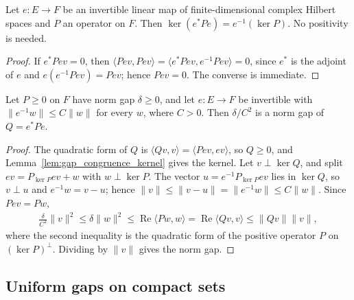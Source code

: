 \begin{lemma}
    \label{lem:gap_congruence_kernel}
    \leanok
    Let $e:E\to F$ be an invertible linear map of finite-dimensional complex Hilbert
    spaces and $P$ an operator on $F$. Then $\ker(e^*Pe)=e^{-1}(\ker P)$. No
    positivity is needed.
\end{lemma}
\begin{proof}\leanok
    If $e^*Pev=0$, then $\langle Pev,Pev\rangle=\langle e^*Pev,e^{-1}Pev\rangle=0$,
    since $e^*$ is the adjoint of $e$ and $e(e^{-1}Pev)=Pev$; hence $Pev=0$. The
    converse is immediate.
\end{proof}

\begin{theorem}
    \label{thm:gap_bounded_congruence}
    \leanok
    Let $P\ge0$ on $F$ have norm gap $\delta\ge0$, and let $e:E\to F$ be invertible with
    $\lVert e^{-1}w\rVert\le C\lVert w\rVert$ for every $w$, where $C>0$. Then
    $\delta/C^2$ is a norm gap of $Q=e^*Pe$.
\end{theorem}
\begin{proof}\leanok
    The quadratic form of $Q$ is $\langle Qv,v\rangle=\langle Pev,ev\rangle$, so
    $Q\ge0$, and Lemma~\ref{lem:gap_congruence_kernel} gives the kernel. Let
    $v\perp\ker Q$, and split $ev=P_{\ker P}ev+w$ with $w\perp\ker P$. The vector
    $u=e^{-1}P_{\ker P}ev$ lies in $\ker Q$, so $v\perp u$ and $e^{-1}w=v-u$; hence
    $\lVert v\rVert\le\lVert v-u\rVert=\lVert e^{-1}w\rVert\le C\lVert w\rVert$.
    Since $Pev=Pw$,
    \begin{align*}
        \tfrac{\delta}{C^2}\lVert v\rVert^2\le\delta\lVert w\rVert^2
        \le\operatorname{Re}\langle Pw,w\rangle=\operatorname{Re}\langle Qv,v\rangle
        \le\lVert Qv\rVert\lVert v\rVert,
    \end{align*}
    where the second inequality is the quadratic form of the positive operator $P$ on
    $(\ker P)^\perp$. Dividing by $\lVert v\rVert$ gives the norm gap.
\end{proof}

\subsection{Uniform gaps on compact sets}
\label{sec:martingale_gaps_compact}

